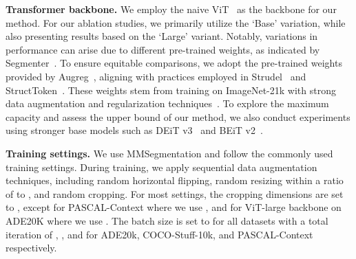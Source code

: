 \textbf{Transformer backbone.} 
We employ the naive ViT~\cite{vit} as the backbone for our method. 
For our ablation studies, we primarily utilize the `Base' variation, while also presenting results based on the `Large' variant. Notably, variations in performance can arise due to different pre-trained weights, as indicated by Segmenter~\cite{strudel2021segmenter}. To ensure equitable comparisons, we adopt the pre-trained weights provided by Augreg~\cite{augreg}, aligning with practices employed in Strudel~\cite{strudel2021segmenter} and StructToken~\cite{lin2022structtoken}. These weights stem from training on ImageNet-21k with strong data augmentation and regularization techniques~\cite{augreg}.
To explore the maximum capacity and assess the upper bound of our method, we also conduct experiments using stronger base models such as DEiT v3~\cite{touvron2022deit} and BEiT v2~\cite{beitv2}.

\noindent\textbf{Training settings.}
We use MMSegmentation \cite{mmseg} and follow the commonly used training settings. 
During training, we apply sequential data augmentation techniques, including random horizontal flipping, random resizing within a ratio of  to , and random cropping. For most settings, the cropping dimensions are set to , except for PASCAL-Context where we use , and for ViT-large backbone on ADE20K where we use .
The batch size is set to  for all datasets with a total iteration of , , and  for ADE20k, COCO-Stuff-10k, and PASCAL-Context respectively. 



